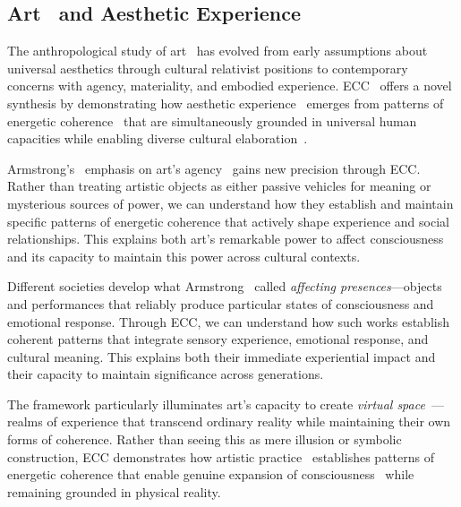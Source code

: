 \subsection*{Art~ and Aesthetic Experience~}

The anthropological study of art~ has evolved from early assumptions about universal aesthetics through cultural relativist positions to contemporary concerns with agency, materiality, and embodied experience. ECC~ offers a novel synthesis by demonstrating how aesthetic experience~ emerges from patterns of energetic coherence~ that are simultaneously grounded in universal human capacities while enabling diverse cultural elaboration~\cite{gell1998art,keane2003semiotics}.

Armstrong's~\cite{armstrong1971affecting,armstrong1981powers} emphasis on art's agency~ gains new precision through ECC. Rather than treating artistic objects as either passive vehicles for meaning or mysterious sources of power, we can understand how they establish and maintain specific patterns of energetic coherence that actively shape experience and social relationships. This explains both art's remarkable power to affect consciousness and its capacity to maintain this power across cultural contexts.

Different societies develop what Armstrong~\cite{armstrong1971affecting,armstrong1981powers} called \textit{affecting presences}—objects and performances that reliably produce particular states of consciousness and emotional response. Through ECC, we can understand how such works establish coherent patterns that integrate sensory experience, emotional response, and cultural meaning. This explains both their immediate experiential impact and their capacity to maintain significance across generations.

The framework particularly illuminates art's capacity to create \textit{virtual space}~\cite{langer1953feeling,ingold2013making}—realms of experience that transcend ordinary reality while maintaining their own forms of coherence. Rather than seeing this as mere illusion or symbolic construction, ECC demonstrates how artistic practice~ establishes patterns of energetic coherence that enable genuine expansion of consciousness~ while remaining grounded in physical reality.

